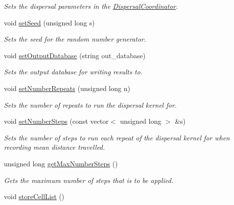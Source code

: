 \begin{DoxyCompactItemize}
\begin{DoxyCompactList}\small\item\em Sets the dispersal parameters in the \hyperlink{class_dispersal_coordinator}{Dispersal\+Coordinator}. \end{DoxyCompactList}\item 
void \hyperlink{class_simulate_dispersal_a46f2cd557ac9b21c107eac75e7c916af}{set\+Seed} (unsigned long s)
\begin{DoxyCompactList}\small\item\em Sets the seed for the random number generator. \end{DoxyCompactList}\item 
void \hyperlink{class_simulate_dispersal_acae5067045d5989df6d7dce80bcfe276}{set\+Output\+Database} (string out\+\_\+database)
\begin{DoxyCompactList}\small\item\em Sets the output database for writing results to. \end{DoxyCompactList}\item 
void \hyperlink{class_simulate_dispersal_a29c7cf41d8b5610109d61f302fb32e73}{set\+Number\+Repeats} (unsigned long n)
\begin{DoxyCompactList}\small\item\em Sets the number of repeats to run the dispersal kernel for. \end{DoxyCompactList}\item 
void \hyperlink{class_simulate_dispersal_a3cfb1aff1981021b6047c9625919ce3d}{set\+Number\+Steps} (const vector$<$ unsigned long $>$ \&s)
\begin{DoxyCompactList}\small\item\em Sets the number of steps to run each repeat of the dispersal kernel for when recording mean distance travelled. \end{DoxyCompactList}\item 
unsigned long \hyperlink{class_simulate_dispersal_a348d4405655b91f6ce2b83752ce6f7af}{get\+Max\+Number\+Steps} ()
\begin{DoxyCompactList}\small\item\em Gets the maximum number of steps that is to be applied. \end{DoxyCompactList}\item 
void \hyperlink{class_simulate_dispersal_a85d8ee68e5f4962429571c835aa028b4}{store\+Cell\+List} ()\hypertarget{class_simulate_dispersal_a85d8ee68e5f4962429571c835aa028b4}{}\label{class_simulate_dispersal_a85d8ee68e5f4962429571c835aa028b4}


\end{DoxyCompactItemize}
